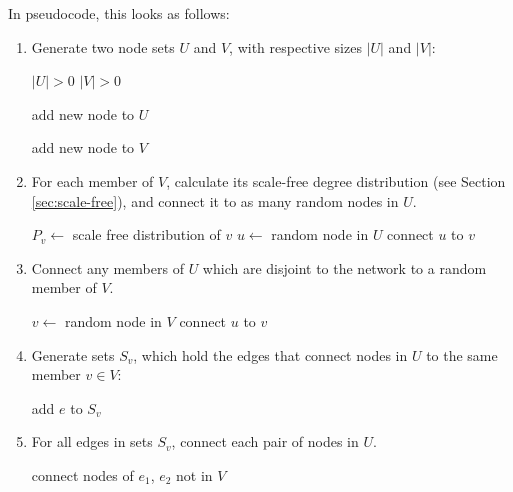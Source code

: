 \documentclass[a4paper,11pt,titlepage]{article}
\begin{document}
\noindent In pseudocode, this looks as follows:
\begin{enumerate}
  \item Generate two node sets $U$ and $V$, with respective sizes
    $|U|$ and $|V|$:

    \begin{algorithmic}
      \REQUIRE $|U| > 0$
      \REQUIRE $|V| > 0$

        \STATE add new node to $U$
      \ENDFOR

        \STATE add new node to $V$
      \ENDFOR
    \end{algorithmic}

  \item For each member of $V$, calculate its scale-free degree
    distribution (see Section \ref{sec:scale-free}), and connect it to as
    many random nodes in $U$.

    \begin{algorithmic}
        \STATE $P_v \gets$ scale free distribution of $v$
          \STATE $u \gets $ random node in $U$
          \STATE connect $u$ to $v$
        \ENDFOR
      \ENDFOR
    \end{algorithmic}

  \item Connect any members of $U$ which are disjoint to the network
    to a random member of $V$.

    \begin{algorithmic}
      \STATE $v \gets$ random node in $V$
          \STATE connect $u$ to $v$
        \ENDIF
      \ENDFOR
    \end{algorithmic}

  \item Generate sets $S_v$, which hold the edges that connect nodes
    in $U$ to the same member $v \in V$:

  \begin{algorithmic}
          \STATE add $e$ to $S_v$
        \ENDIF
      \ENDFOR
    \ENDFOR
  \end{algorithmic}

  \item For all edges in sets $S_v$, connect each pair of nodes in
    $U$.

  \begin{algorithmic}
          \STATE connect nodes of $e_1$, $e_2$ not in $V$
        \ENDFOR
      \ENDFOR
    \ENDFOR
  \end{algorithmic}


\end{enumerate}
\end{document}
